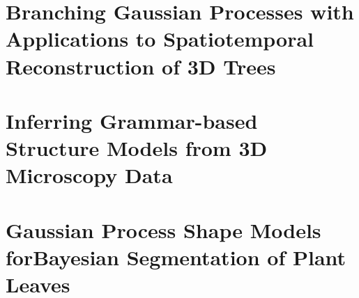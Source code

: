 \documentclass{article}
\begin{document}
\section{Branching Gaussian Processes with Applications to Spatiotemporal Reconstruction of 3D Trees ~\cite{simek-2016-branching}}

\section{Inferring Grammar-based Structure Models from 3D Microscopy Data ~\cite{schlecht-2007-inferring}}

\section{Gaussian Process Shape Models forBayesian Segmentation of Plant Leaves ~\cite{simek-2015-gaussian}}






	
\end{document}
